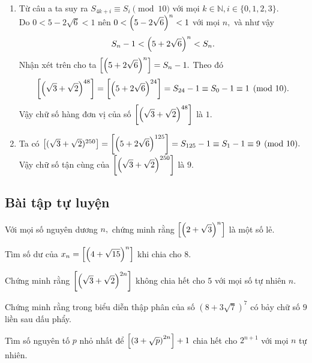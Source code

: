 \begin{bx}
{\begin{enumerate}[a,]
\[\begin{aligned}
      S_{n+4}&=10S_{n+3}-S_{n+2}\\
      &=10S_{n+3}-\tron{10S_{n+1}-S_n}\\
      &=10S_{n+3}-10S_{n+1}+S_n\equiv S_n\pmod{10}.
      \end{aligned}
      \]Do vậy $S_{n+4}$ và $S_n$ có cùng chữ số tận cùng. Đây là điều phải chứng minh.
      \item Từ câu a ta suy ra $S_{4k+i}\equiv S_{i}\pmod{10}$ với mọi $k\in\mathbb{N}, i\in\{0,1,2,3\}.$\\
      Do $0<5-2\sqrt{6}<1$ nên $0<\left(\displaystyle 5-2\sqrt{6} \right)^n<1$ với mọi $n,$ và như vậy \[S_n-1<\left(\displaystyle 5+2\sqrt{6} \right)^n<S_n.\] 
      Nhận xét trên cho ta $\left[ \left(\displaystyle 5+2\sqrt{6} \right)^n \right]=S_n-1.$ Theo đó $$\left[ \left(\displaystyle \sqrt{3}+\sqrt{2} \right)^{48} \right]=\left[ \left(\displaystyle 5+2\sqrt{6} \right)^{24} \right]=S_{24}-1\equiv S_0-1\equiv 1\pmod {10}.$$ Vậy chữ số hàng đơn vị của số $\left[ \left(\displaystyle \sqrt{3}+\sqrt{2} \right)^{48} \right]$ là $1.$
      \item Ta có $\left[(\sqrt{3}+\sqrt{2})^{250}\right]=\left[ \left(\displaystyle 5+2\sqrt{6} \right)^{125} \right]=S_{125}-1\equiv S_1-1\equiv 9\pmod{10}.$ \\Vậy chữ số tận cùng của $\left[\left(\displaystyle \sqrt{3}+\sqrt{2} \right)^{250}\right]$ là $9.$
\end{enumerate}}
\end{bx}

\subsection*{Bài tập tự luyện}

\begin{btt}
Với mọi số nguyên dương $n,$ chứng minh rằng $\left[\left(\displaystyle 2+\sqrt{3} \right)^{n}\right]$ là một số lẻ.
\end{btt}

\begin{btt}
Tìm số dư của $x_{n}=\left[\left(\displaystyle 4+\sqrt{15} \right)^{n}\right]$ khi chia cho $8.$
\end{btt}

\begin{btt}
Chứng minh rằng $\left[\left(\displaystyle \sqrt{3}+\sqrt{2} \right)^{2 n}\right]$ không chia hết cho $5$ với mọi số tự nhiên $n.$
\end{btt}

\begin{btt}
Chứng minh rằng trong biểu diễn
thập phân của số $\left(8+3 \sqrt{7}\right)^{7}$ có bảy chữ số $9$ liền sau dấu phẩy.
\end{btt}

\begin{btt}
Tìm số nguyên tố $p$ nhỏ nhất để $\left[\left(\displaystyle 3+\sqrt{p} \right)^{2 n}\right]+1$ chia hết cho $2^{n+1}$ với mọi $n$ tự nhiên.
\end{btt}

